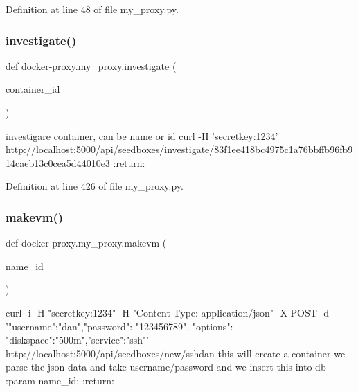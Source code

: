 Definition at line 48 of file my\+\_\+proxy.\+py.

\hypertarget{namespacedocker-proxy_1_1my__proxy_a51d957f776d16e54de05b7034b113c1f}{}\label{namespacedocker-proxy_1_1my__proxy_a51d957f776d16e54de05b7034b113c1f} 
\subsubsection{\texorpdfstring{investigate()}{investigate()}}
{\footnotesize\ttfamily def docker-\/proxy.\+my\+\_\+proxy.\+investigate (\begin{DoxyParamCaption}\item[{}]{container\+\_\+id }\end{DoxyParamCaption})}

\begin{DoxyVerb}investigare container, can be name or id
curl -H 'secretkey:1234' http://localhost:5000/api/seedboxes/investigate/83f1ee418bc4975c1a76bbffb96fb914caeb13c0cea5d44010e3
:return:
\end{DoxyVerb}
 

Definition at line 426 of file my\+\_\+proxy.\+py.

\hypertarget{namespacedocker-proxy_1_1my__proxy_aaab4affe92f8974338caa10c0cf70c22}{}\label{namespacedocker-proxy_1_1my__proxy_aaab4affe92f8974338caa10c0cf70c22} 
\subsubsection{\texorpdfstring{makevm()}{makevm()}}
{\footnotesize\ttfamily def docker-\/proxy.\+my\+\_\+proxy.\+makevm (\begin{DoxyParamCaption}\item[{}]{name\+\_\+id }\end{DoxyParamCaption})}

\begin{DoxyVerb}curl -i -H "secretkey:1234" -H "Content-Type: application/json" -X POST -d '{"username":"dan","password":
"123456789", "options": {"diskspace":"500m","service":"ssh"}}' http://localhost:5000/api/seedboxes/new/sshdan
this will create a container
we parse the json data and take username/password and we insert this into db
:param name_id:
:return:
\end{DoxyVerb}
 

